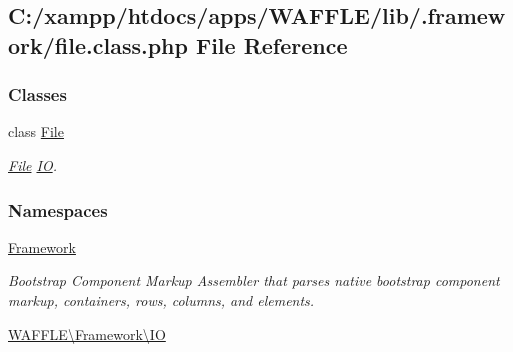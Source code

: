 \hypertarget{file_8class_8php}{}\subsection{C\+:/xampp/htdocs/apps/\+W\+A\+F\+F\+L\+E/lib/.framework/file.class.\+php File Reference}
\label{file_8class_8php}
\subsubsection*{Classes}
\begin{DoxyCompactItemize}
\item 
class \hyperlink{class_w_a_f_f_l_e_1_1_framework_1_1_i_o_1_1_file}{File}
\begin{DoxyCompactList}\small\item\em \hyperlink{class_w_a_f_f_l_e_1_1_framework_1_1_i_o_1_1_file}{File} \hyperlink{namespace_w_a_f_f_l_e_1_1_framework_1_1_i_o}{IO}. \end{DoxyCompactList}\end{DoxyCompactItemize}
\subsubsection*{Namespaces}
\begin{DoxyCompactItemize}
\item 
 \hyperlink{namespace_framework}{Framework}
\begin{DoxyCompactList}\small\item\em Bootstrap Component Markup Assembler that parses native bootstrap component markup, containers, rows, columns, and elements. \end{DoxyCompactList}\item 
 \hyperlink{namespace_w_a_f_f_l_e_1_1_framework_1_1_i_o}{W\+A\+F\+F\+L\+E\textbackslash{}\+Framework\textbackslash{}\+IO}
\end{DoxyCompactItemize}
